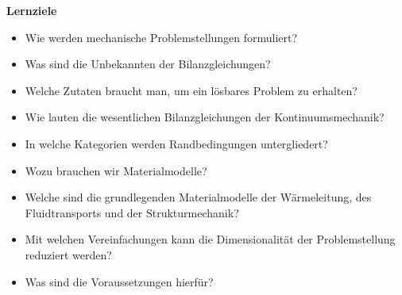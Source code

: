 


\begin{framed}
\textbf{Lernziele}\\
\begin{itemize}
\item Wie werden mechanische Problemstellungen formuliert?
\item Was sind die Unbekannten der Bilanzgleichungen?
\item Welche Zutaten braucht man, um ein lösbares Problem zu erhalten?
\item Wie lauten die wesentlichen Bilanzgleichungen der Kontinuumsmechanik?
\item In welche Kategorien werden Randbedingungen untergliedert?
\item Wozu brauchen wir Materialmodelle?
\item Welche sind die grundlegenden Materialmodelle der Wärmeleitung, des Fluidtransports und der Strukturmechanik?
\item Mit welchen Vereinfachungen kann die Dimensionalität der Problemstellung reduziert werden?
\item Was sind die Voraussetzungen hierfür?
\end{itemize}
\end{framed}

